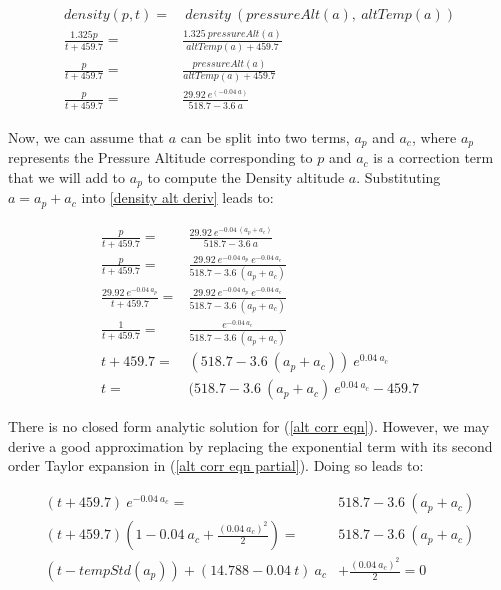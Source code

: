 \documentclass[10pt,a4paper]{article}
\begin{document}
\begin{align}
density (p, t) =&\ density\ (pressureAlt (a),\ altTemp (a))\\
\frac{1.325 p}{t + 459.7} =& \frac{1.325\ pressureAlt (a)}{altTemp (a) + 459.7}\\
\frac{p}{t + 459.7} =& \frac{pressureAlt (a)}{altTemp (a) + 459.7}\\
\label{density alt deriv}
\frac{p}{t + 459.7} =& \frac{29.92\ e^{(- 0.04\ a)}}{518.7 - 3.6\ a}
\end{align}

Now, we can assume that $a$ can be split into two terms, $a_{p}$ and $a_{c}$, where $a_{p}$ represents the Pressure Altitude corresponding to $p$ and $a_{c}$ is a correction term that we will add to $a_{p}$ to compute the Density altitude $a$. Substituting $a = a_{p} + a_{c}$ into \ref{density alt deriv} leads to:

\begin{align}
\frac{p}{t + 459.7} =& \frac{29.92\ e^{- 0.04\ (a_{p} + a_{c})}}{518.7 - 3.6\ a}\\
\frac{p}{t + 459.7} =& \frac{29.92\ e^{- 0.04\ a_{p}}\ e^{- 0.04\ a_{c}}}{518.7 - 3.6\ (a_{p} + a_{c})}\\
\frac{29.92\ e^{- 0.04\ a_{p}}}{t + 459.7} =& \frac{29.92\ e^{- 0.04\ a_{p}}\ e^{- 0.04\ a_{c}}}{518.7 - 3.6\ (a_{p} + a_{c})}\\
\frac{1}{t + 459.7} =& \frac{e^{- 0.04\ a_{c}}}{518.7 - 3.6\ (a_{p} + a_{c})}\\
\label{alt corr eqn partial}
t + 459.7 =& (518.7 - 3.6\ (a_{p} + a_{c}))\ e^{0.04\ a_{c}}\\
\label{alt corr eqn}
t =& (518.7 - 3.6\ (a_{p} + a_{c})\ e^{0.04\ a_{c}} - 459.7
\end{align}

There is no closed form analytic solution for (\ref{alt corr eqn}). However, we may derive a good approximation by replacing the exponential term with its second order Taylor expansion in (\ref{alt corr eqn partial}). Doing so leads to:

\begin{align}
(t + 459.7)\ e^{- 0.04\ a_{c}} =& 518.7 - 3.6\ (a_{p} + a_{c})\\
(t + 459.7)(1 - 0.04\ a_{c} + \frac{(0.04\ a_{c})^2}{2}) =& 518.7 - 3.6\ (a_{p} + a_{c}) \\
\label{temp corr eqn}
(t - tempStd (a_p)) + (14.788 - 0.04\ t)\ a_c &+ \frac{(0.04\ a_c)^2}{2} = 0
\end{align}
\end{document}
